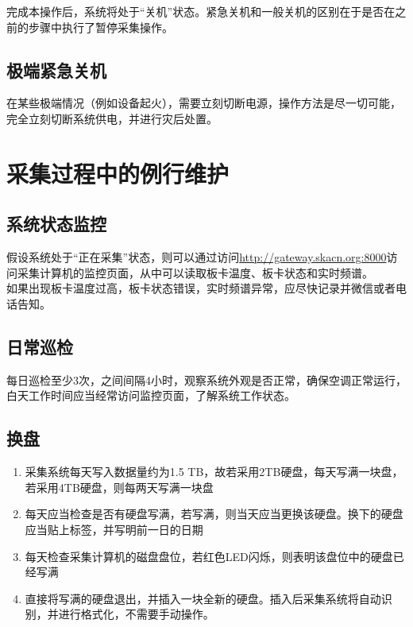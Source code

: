 \documentclass[11pt,includemp,a4paper]{article}
\begin{document}
完成本操作后，系统将处于“关机”状态。紧急关机和一般关机的区别在于是否在之前的步骤中执行了暂停采集操作。

\subsection{极端紧急关机}
在某些极端情况（例如设备起火），需要立刻切断电源，操作方法是尽一切可能，完全立刻切断系统供电，并进行灾后处置。

\section{采集过程中的例行维护}
\subsection{系统状态监控}
假设系统处于“正在采集”状态，则可以通过访问\url{http://gateway.skacn.org:8000}访问采集计算机的监控页面，从中可以读取板卡温度、板卡状态和实时频谱。\\
如果出现板卡温度过高，板卡状态错误，实时频谱异常，应尽快记录并微信或者电话告知。

\subsection{日常巡检}
每日巡检至少3次，之间间隔4小时，观察系统外观是否正常，确保空调正常运行，白天工作时间应当经常访问监控页面，了解系统工作状态。

\subsection{换盘}
\begin{enumerate}
    \item 采集系统每天写入数据量约为1.5 TB，故若采用2TB硬盘，每天写满一块盘，若采用4TB硬盘，则每两天写满一块盘
    \item 每天应当检查是否有硬盘写满，若写满，则当天应当更换该硬盘。换下的硬盘应当贴上标签，并写明前一日的日期
    \item 每天检查采集计算机的磁盘盘位，若红色LED闪烁，则表明该盘位中的硬盘已经写满
    \item 直接将写满的硬盘退出，并插入一块全新的硬盘。插入后采集系统将自动识别，并进行格式化，不需要手动操作。
\end{enumerate}
\end{document}
